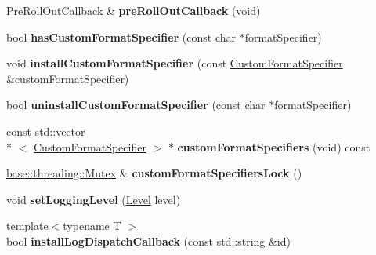 \begin{DoxyCompactItemize}
\item 
\hypertarget{classel_1_1base_1_1Storage_a90a3a886437746acae51cacbd5731572}{Pre\-Roll\-Out\-Callback \& {\bfseries pre\-Roll\-Out\-Callback} (void)}\label{classel_1_1base_1_1Storage_a90a3a886437746acae51cacbd5731572}

\item 
\hypertarget{classel_1_1base_1_1Storage_ae953cb6e8acafa96c5c1ab2f4826a4a5}{bool {\bfseries has\-Custom\-Format\-Specifier} (const char $\ast$format\-Specifier)}\label{classel_1_1base_1_1Storage_ae953cb6e8acafa96c5c1ab2f4826a4a5}

\item 
\hypertarget{classel_1_1base_1_1Storage_a355aac8191ab98869a52394cc868a315}{void {\bfseries install\-Custom\-Format\-Specifier} (const \hyperlink{classel_1_1CustomFormatSpecifier}{Custom\-Format\-Specifier} \&custom\-Format\-Specifier)}\label{classel_1_1base_1_1Storage_a355aac8191ab98869a52394cc868a315}

\item 
\hypertarget{classel_1_1base_1_1Storage_a68e1d3e0b657418ddb0f62f60fe979d2}{bool {\bfseries uninstall\-Custom\-Format\-Specifier} (const char $\ast$format\-Specifier)}\label{classel_1_1base_1_1Storage_a68e1d3e0b657418ddb0f62f60fe979d2}

\item 
\hypertarget{classel_1_1base_1_1Storage_aaafbc69cac920ec79f60e1cf4c2c12d6}{const std\-::vector\\*
$<$ \hyperlink{classel_1_1CustomFormatSpecifier}{Custom\-Format\-Specifier} $>$ $\ast$ {\bfseries custom\-Format\-Specifiers} (void) const }\label{classel_1_1base_1_1Storage_aaafbc69cac920ec79f60e1cf4c2c12d6}

\item 
\hypertarget{classel_1_1base_1_1Storage_a9f36e06277712a52fd0072f93f068c6f}{\hyperlink{classel_1_1base_1_1threading_1_1internal_1_1NoMutex}{base\-::threading\-::\-Mutex} \& {\bfseries custom\-Format\-Specifiers\-Lock} ()}\label{classel_1_1base_1_1Storage_a9f36e06277712a52fd0072f93f068c6f}

\item 
\hypertarget{classel_1_1base_1_1Storage_a163473357c32184769e8edd993c8b440}{void {\bfseries set\-Logging\-Level} (\hyperlink{namespaceel_ab0ac6091262344c52dd2d3ad099e8e36}{Level} level)}\label{classel_1_1base_1_1Storage_a163473357c32184769e8edd993c8b440}

\item 
\hypertarget{classel_1_1base_1_1Storage_aec36c8e770c0ac354e74d57aba1cfa03}{{\footnotesize template$<$typename T $>$ }\\bool {\bfseries install\-Log\-Dispatch\-Callback} (const std\-::string \&id)}\label{classel_1_1base_1_1Storage_aec36c8e770c0ac354e74d57aba1cfa03}


\end{DoxyCompactItemize}
